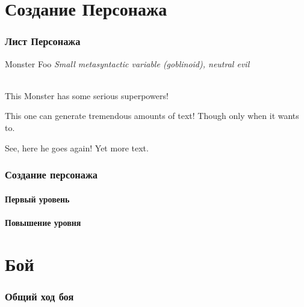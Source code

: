 \documentclass[10pt,twoside,twocolumn,openany]{book}
\begin{document}
\selectfont
\tableofcontents

\clearpage
\part{Создание Персонажа}
\onecolumn
\section{Лист Персонажа}
\begin{monsterbox}{Monster Foo}
	\textit{Small metasyntactic variable (goblinoid), neutral evil}\\
	\hline
	\stats[STR = \stat{3}, DEX = \stat{3}, CON = \stat{2}, INT = \stat{2}, WIT = \stat{1}, WIL = \stat{5}]
	\hline
	\basics[armorclass = 12, hitpoints = 16 (3d8+3), speed = 50 ft]
	\hline
	\details[languages = {Common Lisp, Erlang},]
	\hline \\[1mm]
	\begin{monsteraction}
		This Monster has some serious superpowers!
	\end{monsteraction}
	\begin{monsteraction}
		This one can generate tremendous amounts of text! Though only when it wants to.
	\end{monsteraction}
	\begin{monsteraction}
		See, here he goes again! Yet more text.
	\end{monsteraction}
\end{monsterbox}
\twocolumn
\clearpage

\section{Создание персонажа}
\lipsum[1]
\subsection{Первый уровень}
\lipsum[1]
\subsection{Повышение уровня}
\lipsum[1]

\part{Бой}
\section{Общий ход боя}
\lipsum[1]
\end{document}
